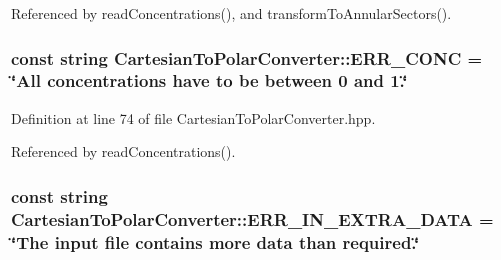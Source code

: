 \-Referenced by read\-Concentrations(), and transform\-To\-Annular\-Sectors().

\hypertarget{classmultiscale_1_1video_1_1CartesianToPolarConverter_a2657e7972c2d3f7cc4c0011ccd8423e4}{
\subsubsection[{\-E\-R\-R\-\_\-\-C\-O\-N\-C}]{\setlength{\rightskip}{0pt plus 5cm}const string {\bf \-Cartesian\-To\-Polar\-Converter\-::\-E\-R\-R\-\_\-\-C\-O\-N\-C} = \char`\"{}\-All {\bf concentrations} have to be between 0 and 1.\char`\"{}}}\label{classmultiscale_1_1video_1_1CartesianToPolarConverter_a2657e7972c2d3f7cc4c0011ccd8423e4}


\-Definition at line 74 of file \-Cartesian\-To\-Polar\-Converter.\-hpp.



\-Referenced by read\-Concentrations().

\hypertarget{classmultiscale_1_1video_1_1CartesianToPolarConverter_a27c4664c63c53cc5351bbb3233bdfce1}{
\subsubsection[{\-E\-R\-R\-\_\-\-I\-N\-\_\-\-E\-X\-T\-R\-A\-\_\-\-D\-A\-T\-A}]{\setlength{\rightskip}{0pt plus 5cm}const string {\bf \-Cartesian\-To\-Polar\-Converter\-::\-E\-R\-R\-\_\-\-I\-N\-\_\-\-E\-X\-T\-R\-A\-\_\-\-D\-A\-T\-A} = \char`\"{}\-The input file contains more data than required.\char`\"{}}}\label{classmultiscale_1_1video_1_1CartesianToPolarConverter_a27c4664c63c53cc5351bbb3233bdfce1}


